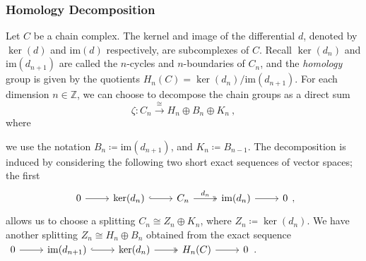 \documentclass[11pt, table, nothms]{amsart}
\theoremstyle{definition}
\newcommand{\rH}{H}
\newcommand{\Z}{\mathbb{Z}}
\newcommand{\ima}{\mathrm{im}}
\begin{document}
\subsubsection{Homology Decomposition}
Let $C$ be a chain complex.
The kernel and image of the differential $d$, denoted by $\ker(d)$ and $\ima(d)$ respectively, are subcomplexes of $C$.
Recall $\ker(d_n)$ and $\ima(d_{n+1})$ are called the $n$-cycles and $n$-boundaries of $C_n$, and the \emph{homology} group is given by the quotients 
$\rH_n(C)= \ker(d_n)\big/ \ima(d_{n+1})$. 
For each dimension $n \in \Z$, we can choose to decompose the chain groups as a direct sum
\begin{equation}\label{eq:splitting-homology}
\zeta: C_n \xrightarrow{\cong} H_n \oplus B_n \oplus K_{n}\ ,
\end{equation}
where {we use the notation  $B_n\coloneqq \ima(d_{n+1})$, and  $K_{n}\coloneqq B_{n-1}$. 
The decomposition is induced by considering the following two short exact sequences of vector spaces; the first
\[
\begin{tikzcd}
    0 \ar[r] &
    \ker(d_n) \ar[r, hookrightarrow ] &
    C_n \ar[r, "d_n", twoheadrightarrow] &
     \ima(d_n) \ar[r] &
    0
\end{tikzcd},
\]
allows us to choose a splitting $C_n \cong Z_n \oplus K_{n}$, where 
$Z_n 
\coloneqq \ker(d_n)$.
We have another splitting $Z_n\cong H_n\oplus B_n$ obtained from the exact sequence
$
\begin{tikzcd}
    0 \ar[r] &
    \ima(d_{n+1}) \ar[r, hookrightarrow] &
    \ker(d_n) \ar[r, twoheadrightarrow] &
    \rH_n(C) \ar[r] &
    0
\end{tikzcd}
$.

}
\end{document}
